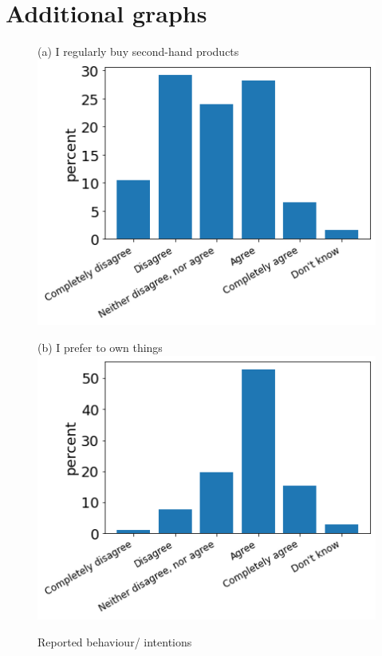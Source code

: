 \documentclass[12pt]{article}
\begin{document}
\section{Additional graphs}
\begin{figure}[h!!]
	\centering	
	\caption{Reported behaviour/ intentions}\label{fig:behaviour}	
	\begin{minipage}[h!!]{0.32\textwidth}  
		\centering\footnotesize{(a) I regularly buy second-hand products}
		\includegraphics[width=1\textwidth]{../codding_data/results/liss/qk20a135title0.png}
	\end{minipage}
	\begin{minipage}[h!!]{0.32\textwidth}
		\centering\footnotesize{(b) I prefer to own things}
		\includegraphics[width=1\textwidth]{../codding_data/results/liss/qk20a144title0.png}

\end{minipage}
\end{figure}
\end{document}
